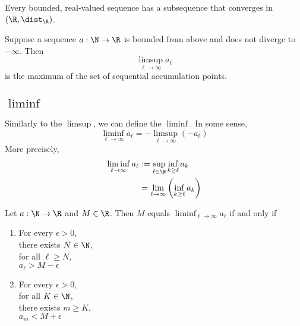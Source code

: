 \begin{corollary}
    Every bounded, real-valued sequence has a subsequence that converges in $(\R, \dist_\R)$.
\end{corollary}

\begin{theorem}
    Suppose a sequence $a: \N \to \R$ is bounded from above and does not diverge to $-\infty$. Then
    $$\limsup_{\ell\to\infty}a_\ell$$
    is the maximum of the set of sequential accumulation points.
\end{theorem}

\subsection{$\liminf$}
Similarly to the $\limsup$, we can define the $\liminf$. In some sense,
$$\liminf_{\ell\to\infty}a_\ell = -\limsup_{\ell\to\infty}(-a_\ell)$$
More precisely, 
\begin{align*}
    \liminf_{\ell\to\infty}a_\ell &:= \sup_{\ell\in\N}\inf_{k \ge \ell}a_k\\
                                  &=\lim_{\ell\to\infty}\left(\inf_{k\ge\ell}a_k\right)
\end{align*}

\begin{proposition}
    Let $a: \N \to \R$ and $M \in \R$. Then $M$ equals $\liminf_{\ell\to\infty}a_\ell$ if and only if
    \begin{enumerate}
        \item 
            \begin{center}
                \parbox{\linewidth}{
                    \linewidth
                    For every $\epsilon > 0$, \\
                    \hspace*{1em} there exists $N \in \N$, \\
                    \hspace*{2em} for all $\ell \ge N$, \\
                    \hspace*{3em} $a_\ell > M - \epsilon$
                }
            \end{center}
        \item 
            \begin{center}
                \parbox{\linewidth}{
                    \linewidth
                    For every $\epsilon > 0$, \\
                    \hspace*{1em} for all $K \in \N$, \\
                    \hspace*{2em} there exists $m \ge K$, \\
                    \hspace*{3em} $a_m < M + \epsilon$ \\
                }
            \end{center}
    \end{enumerate}
\end{proposition}

